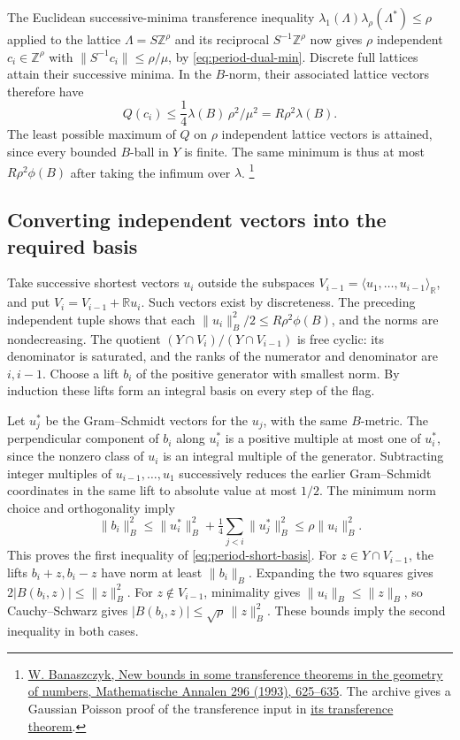 The Euclidean successive-minima transference inequality
\(\lambda_1(\Lambda)\lambda_\rho(\Lambda^*)\le\rho\)
applied to the lattice \(\Lambda=S\mathbb Z^\rho\) and its
reciprocal \(S^{-1}\mathbb Z^\rho\) now gives \(\rho\) independent
\(c_i\in\mathbb Z^\rho\) with
\(\|S^{-1}c_i\|\le\rho/\mu\), by \eqref{eq:period-dual-min}.
Discrete full lattices attain their successive minima.
In the \(B\)-norm, their associated lattice vectors therefore have
\[
    Q(c_i)\le \frac14\lambda(B)\,\rho^2/\mu^2
            =R\rho^2\lambda(B).
\]
The least possible maximum of \(Q\) on \(\rho\) independent
lattice vectors is attained, since every bounded \(B\)-ball in
\(Y\) is finite. The same minimum is thus at most
\(R\rho^2\phi(B)\) after taking the infimum over \(\lambda\).
\footnote{\href{https://doi.org/10.1007/BF01445125}{W. Banaszczyk,
New bounds in some transference theorems in the geometry of numbers,
Mathematische Annalen 296 (1993), 625--635}.
The archive gives a Gaussian Poisson proof of the transference input
in \href{https://github.com/ChristianKudeba/alpoge-rh-verification/blob/alpoge-source-7cbf7a0c/src/Formalism/PeriodIntegrals/OrbitalBoundsConclusion/TransferenceMinima.lean}{its transference theorem}.}

\subsection{Converting independent vectors into the required basis}

Take successive shortest vectors \(u_i\) outside the subspaces
\(V_{i-1}=\langle u_1,\ldots,u_{i-1}\rangle_{\mathbb R}\), and put
\(V_i=V_{i-1}+\mathbb R u_i\). Such vectors exist by discreteness.
The preceding independent tuple shows that each
\(\|u_i\|_B^2/2\le R\rho^2\phi(B)\), and the norms are nondecreasing.
The quotient \((Y\cap V_i)/(Y\cap V_{i-1})\) is free cyclic:
its denominator is saturated, and the ranks of the numerator and
denominator are \(i,i-1\). Choose a lift \(b_i\) of the positive
generator with smallest norm. By induction these lifts form an
integral basis on every step of the flag.

Let \(u_j^*\) be the Gram--Schmidt vectors for the \(u_j\),
with the same \(B\)-metric. The perpendicular component of \(b_i\)
along \(u_i^*\) is a positive multiple at most one of \(u_i^*\),
since the nonzero class of \(u_i\) is an integral multiple of the
generator. Subtracting integer multiples of
\(u_{i-1},\ldots,u_1\) successively reduces the earlier
Gram--Schmidt coordinates in the same lift to absolute value
at most \(1/2\). The minimum norm choice and orthogonality imply
\[
 \|b_i\|_B^2\le\|u_i^*\|_B^2+
       \tfrac14\sum_{j<i}\|u_j^*\|_B^2
       \le \rho\|u_i\|_B^2 .
\]
This proves the first inequality of \eqref{eq:period-short-basis}.
For \(z\in Y\cap V_{i-1}\), the lifts \(b_i+z,b_i-z\) have
norm at least \(\|b_i\|_B\). Expanding the two squares gives
\(2|B(b_i,z)|\le\|z\|_B^2\). For \(z\notin V_{i-1}\), minimality
gives \(\|u_i\|_B\le\|z\|_B\), so Cauchy--Schwarz gives
\(|B(b_i,z)|\le\sqrt{\rho}\,\|z\|_B^2\).
These bounds imply the second inequality in both cases.

